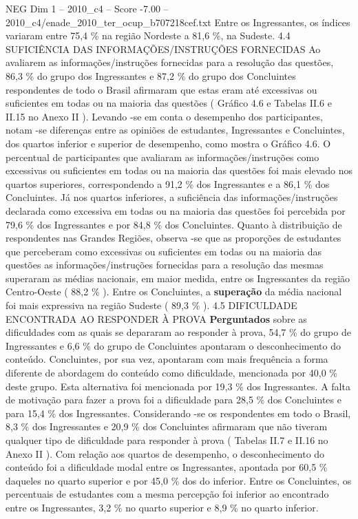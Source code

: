 \begin{textsample}{NEG Dim 1 – 2010\_c4 – Score -7.00 – 2010\_c4/enade\_2010\_ter\_ocup\_b707218cef.txt}
Entre os Ingressantes, os índices variaram entre 75,4 \% na região Nordeste a 81,6 \%, na Sudeste. 4.4 SUFICIÊNCIA DAS INFORMAÇÕES/INSTRUÇÕES FORNECIDAS Ao avaliarem as informações/instruções fornecidas para a resolução das questões, 86,3 \% do grupo dos Ingressantes e 87,2 \% do grupo dos Concluintes respondentes de todo o Brasil afirmaram que estas eram até excessivas ou suficientes em todas ou na maioria das questões ( Gráfico 4.6 e Tabelas II.6 e II.15 no Anexo II ).
Levando -se em conta o desempenho dos participantes, notam -se diferenças entre as opiniões de estudantes, Ingressantes e Concluintes, dos quartos inferior e superior de desempenho, como mostra o Gráfico 4.6.
O percentual de participantes que avaliaram as informações/instruções como excessivas ou suficientes em todas ou na maioria das questões foi mais elevado nos quartos superiores, correspondendo a 91,2 \% dos Ingressantes e a 86,1 \% dos Concluintes.
Já nos quartos inferiores, a suficiência das informações/instruções declarada como excessiva em todas ou na maioria das questões foi percebida por 79,6 \% dos Ingressantes e por 84,8 \% dos Concluintes.
Quanto à distribuição de respondentes nas Grandes Regiões, observa -se que as proporções de estudantes que perceberam como excessivas ou suficientes em todas ou na maioria das questões as informações/instruções fornecidas para a resolução das mesmas superaram as médias nacionais, em maior medida, entre os Ingressantes da região Centro-Oeste ( 88,2 \% ).
Entre os Concluintes, a \textbf{superação} da média nacional foi mais expressiva na região Sudeste ( 89,3 \% ). 4.5 DIFICULDADE ENCONTRADA AO RESPONDER À PROVA \textbf{Perguntados} sobre as dificuldades com as quais se depararam ao responder à prova, 54,7 \% do grupo de Ingressantes e 6,6 \% do grupo de Concluintes apontaram o desconhecimento do conteúdo.
Concluintes, por sua vez, apontaram com mais frequência a forma diferente de abordagem do conteúdo como dificuldade, mencionada por 40,0 \% deste grupo.
Esta alternativa foi mencionada por 19,3 \% dos Ingressantes.
A falta de motivação para fazer a prova foi a dificuldade para 28,5 \% dos Concluintes e para 15,4 \% dos Ingressantes.
Considerando -se os respondentes em todo o Brasil, 8,3 \% dos Ingressantes e 20,9 \% dos Concluintes afirmaram que não tiveram qualquer tipo de dificuldade para responder à prova ( Tabelas II.7 e II.16 no Anexo II ).
Com relação aos quartos de desempenho, o desconhecimento do conteúdo foi a dificuldade modal entre os Ingressantes, apontada por 60,5 \% daqueles no quarto superior e por 45,0 \% dos do inferior.
Entre os Concluintes, os percentuais de estudantes com a mesma percepção foi inferior ao encontrado entre os Ingressantes, 3,2 \% no quarto superior e 8,9 \% no quarto inferior.

\end{textsample}
